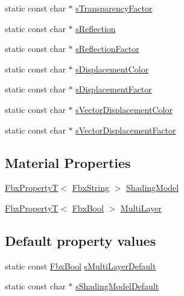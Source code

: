 \begin{DoxyCompactItemize}
\item 
static const char $\ast$ \hyperlink{class_fbx_surface_material_a38bf00f2994371e0739b212a3917826a}{s\+Transparency\+Factor}
\item 
static const char $\ast$ \hyperlink{class_fbx_surface_material_aae008a0c3032aef6782ee608f2bd446a}{s\+Reflection}
\item 
static const char $\ast$ \hyperlink{class_fbx_surface_material_afbc36e9f03dc90b77fdcfef17f2c8b10}{s\+Reflection\+Factor}
\item 
static const char $\ast$ \hyperlink{class_fbx_surface_material_a8e4fdad5870b375006b42000c7063985}{s\+Displacement\+Color}
\item 
static const char $\ast$ \hyperlink{class_fbx_surface_material_a1737650dd9b939f5e9cd6bab9aac83cd}{s\+Displacement\+Factor}
\item 
static const char $\ast$ \hyperlink{class_fbx_surface_material_a4ab63fcc24b285a9d9d9f52a7199d6da}{s\+Vector\+Displacement\+Color}
\item 
static const char $\ast$ \hyperlink{class_fbx_surface_material_a1286fd27069cdb5a3db79be1443783df}{s\+Vector\+Displacement\+Factor}
\end{DoxyCompactItemize}
\subsection*{Material Properties}
\begin{DoxyCompactItemize}
\item 
\hyperlink{class_fbx_property_t}{Fbx\+PropertyT}$<$ \hyperlink{class_fbx_string}{Fbx\+String} $>$ \hyperlink{class_fbx_surface_material_a8be5b9ae45fbf2da2fcc0aca9d1c995b}{Shading\+Model}
\item 
\hyperlink{class_fbx_property_t}{Fbx\+PropertyT}$<$ \hyperlink{fbxtypes_8h_a92e0562b2fe33e76a242f498b362262e}{Fbx\+Bool} $>$ \hyperlink{class_fbx_surface_material_ad62451d6f09f73c151a9f43f9349cd31}{Multi\+Layer}
\end{DoxyCompactItemize}
\subsection*{Default property values}
\begin{DoxyCompactItemize}
\item 
static const \hyperlink{fbxtypes_8h_a92e0562b2fe33e76a242f498b362262e}{Fbx\+Bool} \hyperlink{class_fbx_surface_material_a2d4700a72c52cf6bdfdce2ef4526d8bc}{s\+Multi\+Layer\+Default}
\item 
static const char $\ast$ \hyperlink{class_fbx_surface_material_a9f7362c4d0ad0f41a941159d5e1d27b4}{s\+Shading\+Model\+Default}
\end{DoxyCompactItemize}
